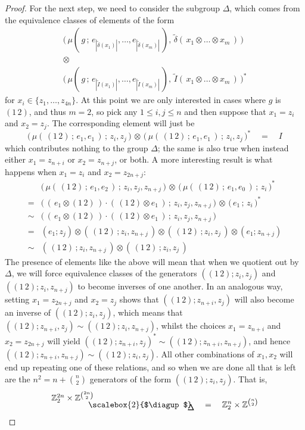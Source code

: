 \documentclass{amsbook} %
\newcommand{\bigquotient}[2]{ \raisebox{0.75\height}{$#1$} \mkern-12mu\scalebox{2}{$\diagup$}\mkern-10mu \raisebox{-0.5\height}{$#2$} }
\numberwithin{section}{chapter}
\begin{document}
\begin{proof}
For the next step, we need to consider the subgroup $\Delta$, which comes from the equivalence classes of elements of the form
\[ \begin{array}{c}
				\big( \, \mu( \, g \, ; \, e_{|\tilde{\delta}(x_1)|}, \ldots, e_{|\tilde{\delta}(x_m)|} \, ), \, \tilde{\delta}( \, x_1 \otimes \ldots \otimes x_m \, ) \, \big) \\
				\otimes \\
				\big( \, \mu( \, g \, ; \, e_{|\tilde{I}(x_1)|}, \ldots, e_{|\tilde{I}(x_m)|} \, ), \, \tilde{I}( \, x_1 \otimes \ldots \otimes x_m \, ) \, \big)^*
		\end{array} 
\]
for $x_i \in \{z_1, \ldots, z_{4n} \}$. At this point we are only interested in cases where $g$ is $(1 \, 2)$, and thus $m=2$, so pick any $1 \le i,j \le n$ and then suppose that $x_1 = z_i$ and $x_2 = z_j$. The corresponding element will just be
\[ \big( \, \mu( \, (1 \, 2) \, ; \, e_1, e_1 \, ) \, ; \, z_i, z_j \, \big) \, \otimes \, \big( \, \mu( \, (1 \, 2) \, ; \, e_1, e_1 \, ) \, ; \, z_i, z_j \, \big)^* \quad = \quad I \]
which contributes nothing to the group $\Delta$; the same is also true when instead either $x_1 = z_{n+i}$ or $x_2 = z_{n+j}$, or both. A more interesting result is what happens when $x_1 = z_i$ and $x_2 = z_{2n+j}$: 
\[ \begin{array}{rl}
			& \big( \, \mu( \, (1 \, 2) \, ; \, e_1, e_2 \, ) \, ; \, z_i , z_j, z_{n+j} \, \big) \, \otimes \, \big( \,  \mu( \, (1 \, 2) \, ; \, e_1, e_0 \, ) \, ; \, z_i \, \big)^* \\
			= & \big( \, ( \, e_1 \otimes (1 \, 2) \, ) \cdot ( \, (1 \, 2) \otimes e_1 \,) \, ; \, z_i , z_j, z_{n+j} \, \big) \, \otimes \, \big( \, e_1 \, ; \, z_i \, \big)^* \\
			\sim & \big( \, ( \, e_1 \otimes (1 \, 2) \, ) \cdot ( \, (1 \, 2) \otimes e_1 \,) \, ; \, z_i , z_j, z_{n+j} \, \big) \\
			= &  (e_1 ; z_j) \otimes ( \, (1 \, 2) \, ;  z_i, z_{n+j} \, ) \otimes ( \, (1 \, 2) \, ;  z_i , z_{j} \, ) \otimes (e_1 ;z_{n+j}) \\
			\sim & ( \, (1 \, 2) \, ;  z_i, z_{n+j} \, ) \otimes ( \, (1 \, 2) \, ;  z_i , z_j \, )
		\end{array}
\]
The presence of elements like the above will mean that when we quotient out by $\Delta$, we will force equivalence classes of the generators $((1 \, 2);  z_i , z_j )$ and $((1 \, 2) ; z_i, z_{n+j})$ to become inverses of one another. In an analogous way, setting $x_1 = z_{2n+j}$ and $x_2 = z_j$ shows that $((1 \, 2) ; z_{n+i}, z_j)$ will also become an inverse of $((1 \, 2); z_i , z_j)$, which means that $((1 \, 2) ; z_{n+i}, z_j) \sim ((1 \, 2) ; z_i, z_{n+j})$, whilst the choices $x_1 = z_{n+i}$ and $x_2 = z_{2n+j}$ will yield $((1 \, 2) ; z_{n+i}, z_j)^* \sim ((1 \, 2) ; z_{n+i}, z_{n+j})$, and hence $((1 \, 2) ; z_{n+i}, z_{n+j}) \sim ((1 \, 2) ; z_i, z_j)$. All other combinations of $x_1, x_2$ will end up repeating one of these relations, and so when we are done all that is left are the $n^2 = n + {{n}\choose{2}}$ generators of the form $((1 \, 2) ; z_i, z_j)$. That is,
\[ \bigquotient{\mathbb{Z}_2^{2n} \times \mathbb{Z}^{{2n}\choose{2}}}{\Delta} \quad = \quad \mathbb{Z}_2^{n} \times \mathbb{Z}^{{n}\choose{2}} \]


\end{proof}
\end{document}
